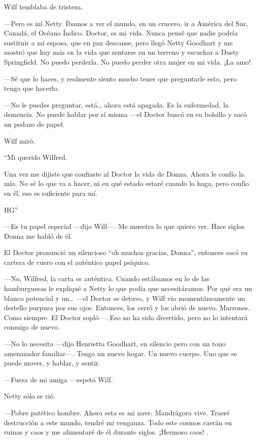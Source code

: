 Wilf temblaba de tristeza.

---Pero es mi Netty. Íbamos a ver el mundo, en un crucero, ir a América
del Sur, Canadá, el Océano Índico. Doctor, es mi vida. Nunca pensé que
nadie podría sustituir a mi esposa, que en paz descanse, pero llegó
Netty Goodhart y me mostró que hay más en la vida que sentarse en un
terreno y escuchar a Dusty Springfield. No puedo perderla. No puedo
perder otra mujer en mi vida. ¡La amo!

---Sé que lo haces, y realmente siento mucho tener que preguntarle esto,
pero tengo que hacerlo.

---No le puedes preguntar, está\ldots{} ahora está apagada. Es la
enfermedad, la demencia. No puede hablar por sí misma ---el Doctor buscó
en su bolsillo y sacó un pedazo de papel.

Wilf miró.

``Mi querido Wilfred.

Una vez me dijiste que confiaste al Doctor la vida de Donna. Ahora le
confío la mía. No sé lo que va a hacer, ni en qué estado estaré cuando
lo haga, pero confío en él, eso es suficiente para mí.

HG''

---Es tu papel especial ---dijo Wilf---. Me muestra lo que quiero ver.
Hace siglos Donna me habló de él.

El Doctor pronunció un silencioso ``oh muchas gracias, Donna'', entonces
sacó su cartera de cuero con el auténtico papel psíquico.

---No, Wilfred, la carta es auténtica. Cuando estábamos en lo de las
hamburguesas le expliqué a Netty lo que podía que necesitáramos. Por qué
era un blanco potencial y un\ldots{} ---el Doctor se detuvo, y Wilf vio
momentáneamente un destello purpura por sus ojos. Entonces, los cerró y
los abrió de nuevo. Marrones. Como siempre. El Doctor sopló---. Eso no
ha sido divertido, pero no lo intentará conmigo de nuevo.

---No lo necesita ---dijo Henrietta Goodhart, en silencio pero con un
tono amenazador familiar---. Tengo un nuevo hogar. Un nuevo cuerpo. Uno
que se puede mover, y hablar, y sentir.

---Fuera de mi amiga ---espetó Wilf.

Netty sólo se rió.

---Pobre patético hombre. Ahora esta es mi nave. Mandrágora vive. Traeré
destrucción a este mundo, tendré mi venganza. Todo este cosmos caerán en
ruinas y caos y me alimentaré de él durante siglos. ¡Hermoso caos! .

